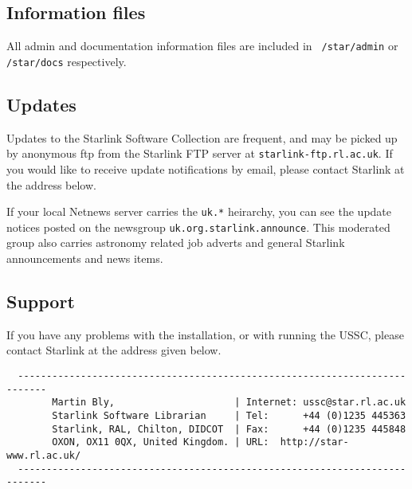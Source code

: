 \subsection{Information files}
\label{s:info:files}

All admin and documentation information files are included in {\tt
/star/admin} or {\tt /star/docs} respectively.

\subsection{Updates}
\label{s:info:updates}

Updates to the Starlink Software Collection are frequent, and may be
picked up by anonymous ftp from the Starlink FTP server at
{\tt starlink-ftp.rl.ac.uk}.  If you would like to receive update
notifications by email, please contact Starlink at the address below.

If your local Netnews server carries the {\tt uk.*} heirarchy, you can 
see the update notices posted on the newsgroup {\tt uk.org.starlink.announce}.
This moderated group also carries astronomy related job adverts and
general Starlink announcements and news items.

\subsection{Support}
\label{s:info:help}

If you have any problems with the installation, or with running the
USSC, please contact Starlink at the address given below.

\begin{verbatim}
  ---------------------------------------------------------------------------
        Martin Bly,                     | Internet: ussc@star.rl.ac.uk
        Starlink Software Librarian     | Tel:      +44 (0)1235 445363
        Starlink, RAL, Chilton, DIDCOT  | Fax:      +44 (0)1235 445848
        OXON, OX11 0QX, United Kingdom. | URL:  http://star-www.rl.ac.uk/
  ---------------------------------------------------------------------------
\end{verbatim}


